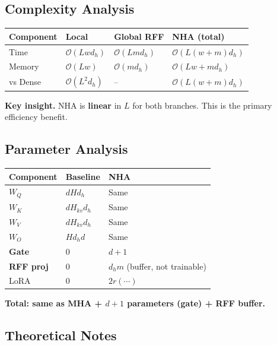 \subsection{Complexity Analysis}

\begin{table}[H]
\centering
\small
\begin{tabular}{llll}
\toprule
\textbf{Component} & \textbf{Local} & \textbf{Global RFF} & \textbf{NHA (total)} \\
\midrule
Time & $\mathcal{O}(L w d_h)$ & $\mathcal{O}(L m d_h)$ & $\mathcal{O}(L (w + m) d_h)$ \\
Memory & $\mathcal{O}(L w)$ & $\mathcal{O}(m d_h)$ & $\mathcal{O}(L w + m d_h)$ \\
vs Dense & $\mathcal{O}(L^2 d_h)$ & -- & \textbf{$\mathcal{O}(L (w + m) d_h)$} \\
\bottomrule
\end{tabular}
\end{table}

\textbf{Key insight.} NHA is \textbf{linear} in $L$ for both branches. This is the 
primary efficiency benefit.

\subsection{Parameter Analysis}

\begin{table}[H]
\centering
\small
\begin{tabular}{lll}
\toprule
\textbf{Component} & \textbf{Baseline} & \textbf{NHA} \\
\midrule
$W_Q$ & $d H d_h$ & Same \\
$W_K$ & $d H_{kv} d_h$ & Same \\
$W_V$ & $d H_{kv} d_h$ & Same \\
$W_O$ & $H d_h d$ & Same \\
\textbf{Gate} & 0 & $d + 1$ \\
\textbf{RFF proj} & 0 & $d_h m$ (buffer, not trainable) \\
LoRA & 0 & $2 r (\cdots)$ \\
\bottomrule
\end{tabular}
\end{table}

\textbf{Total: same as MHA + $d + 1$ parameters (gate) + RFF buffer.}

\subsection{Theoretical Notes}

